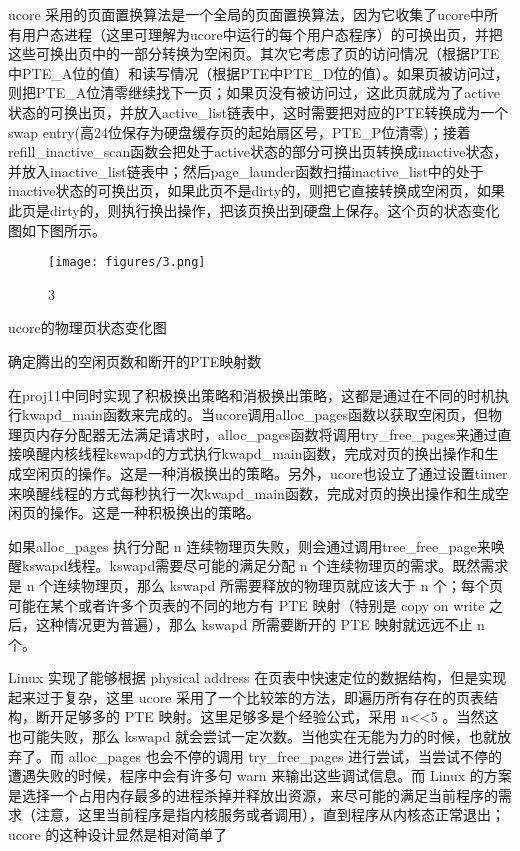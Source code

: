 ucore
采用的页面置换算法是一个全局的页面置换算法，因为它收集了ucore中所有用户态进程（这里可理解为ucore中运行的每个用户态程序）的可换出页，并把这些可换出页中的一部分转换为空闲页。其次它考虑了页的访问情况（根据PTE中PTE\_A位的值）和读写情况（根据PTE中PTE\_D位的值）。如果页被访问过，则把PTE\_A位清零继续找下一页；如果页没有被访问过，这此页就成为了active状态的可换出页，并放入active\_list链表中，这时需要把对应的PTE转换成为一个swap
entry(高24位保存为硬盘缓存页的起始扇区号，PTE\_P位清零)；接着refill\_inactive\_scan函数会把处于active状态的部分可换出页转换成inactive状态，并放入inactive\_list链表中；然后page\_launder函数扫描inactive\_list中的处于inactive状态的可换出页，如果此页不是dirty的，则把它直接转换成空闲页，如果此页是dirty的，则执行换出操作，把该页换出到硬盘上保存。这个页的状态变化图如下图所示。

\begin{figure}[htbp]
\centering
\texttt{[image: figures/3.png]}
\caption{3}
\end{figure}

ucore的物理页状态变化图

确定腾出的空闲页数和断开的PTE映射数

在proj11中同时实现了积极换出策略和消极换出策略，这都是通过在不同的时机执行kwapd\_main函数来完成的。当ucore调用alloc\_pages函数以获取空闲页，但物理页内存分配器无法满足请求时，alloc\_pages函数将调用try\_free\_pages来通过直接唤醒内核线程kswapd的方式执行kwapd\_main函数，完成对页的换出操作和生成空闲页的操作。这是一种消极换出的策略。另外，ucore也设立了通过设置timer来唤醒线程的方式每秒执行一次kwapd\_main函数，完成对页的换出操作和生成空闲页的操作。这是一种积极换出的策略。

如果alloc\_pages 执行分配 n
连续物理页失败，则会通过调用tree\_free\_page来唤醒kswapd线程。kswapd需要尽可能的满足分配
n 个连续物理页的需求。既然需求是 n 个连续物理页，那么 kswapd
所需要释放的物理页就应该大于 n
个；每个页可能在某个或者许多个页表的不同的地方有 PTE 映射（特别是 copy
on write 之后，这种情况更为普遍），那么 kswapd 所需要断开的 PTE
映射就远远不止 n 个。

Linux 实现了能够根据 physical address
在页表中快速定位的数据结构，但是实现起来过于复杂，这里 ucore
采用了一个比较笨的方法，即遍历所有存在的页表结构，断开足够多的 PTE
映射。这里足够多是个经验公式，采用 n\textless{}\textless{}5
。当然这也可能失败，那么 kswapd
就会尝试一定次数。当他实在无能为力的时候，也就放弃了。而 alloc\_pages
也会不停的调用 try\_free\_pages
进行尝试，当尝试不停的遭遇失败的时候，程序中会有许多句 warn
来输出这些调试信息。而 Linux
的方案是选择一个占用内存最多的进程杀掉并释放出资源，来尽可能的满足当前程序的需求（注意，这里当前程序是指内核服务或者调用），直到程序从内核态正常退出；ucore
的这种设计显然是相对简单了

